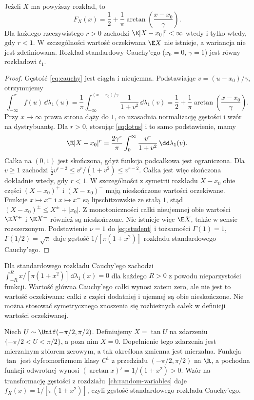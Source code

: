 \begin{stwierdzenie}
Jeżeli $X$ ma powyższy rozkład, to
\[
F_X(x)=\frac12+\frac1\pi
\arctan\!\left(\frac{x-x_0}{\gamma}\right).
\]
Dla każdego rzeczywistego $r>0$ zachodzi
$\E|X-x_0|^r<\infty$ wtedy i tylko wtedy, gdy $r<1$.
W szczególności wartość oczekiwana $\E X$ nie istnieje,
a wariancja nie jest zdefiniowana.
Rozkład standardowy Cauchy'ego ($x_0=0$, $\gamma=1$)
jest równy rozkładowi $t_1$.
\end{stwierdzenie}
\begin{proof}
Gęstość \eqref{eq:cauchy} jest ciągła i nieujemna.
Podstawiając $v=(u-x_0)/\gamma$, otrzymujemy
\[
\int_{-\infty}^x f(u)\,\dd\lambda_1(u)
=\frac1\pi\int_{-\infty}^{(x-x_0)/\gamma}
\frac{1}{1+v^2}\,\dd\lambda_1(v)
=\frac12+\frac1\pi\arctan\!\left(\frac{x-x_0}{\gamma}\right).
\]
Przy $x\to\infty$ prawa strona dąży do $1$, co
uzasadnia normalizację gęstości i wzór na dystrybuantę.
Dla $r>0$, stosując \eqref{eq:lotus} i to samo
podstawienie, mamy
\[
\E|X-x_0|^r=\frac{2\gamma^r}{\pi}
\int_0^\infty\frac{v^r}{1+v^2}\,\dd\lambda_1(v).
\]
Całka na $(0,1)$ jest skończona, gdyż funkcja
podcałkowa jest ograniczona. Dla $v\geq1$ zachodzi
$\tfrac12 v^{r-2}\leq v^r/(1+v^2)\leq v^{r-2}$.
Całka jest więc skończona dokładnie wtedy, gdy $r<1$.
W szczególności z symetrii rozkładu $X-x_0$ obie części
$(X-x_0)^+$ i $(X-x_0)^-$ mają nieskończone wartości
oczekiwane. Funkcje $x\mapsto x^+$ i $x\mapsto x^-$
są lipschitzowskie ze stałą $1$, stąd
$(X-x_0)^\pm\leq X^\pm+|x_0|$.
Z monotoniczności całki nieujemnej obie wartości
$\E X^+$ i $\E X^-$ również są nieskończone.
Nie istnieje więc $\E X$, także w sensie rozszerzonym.
Podstawienie $\nu=1$ do \eqref{eq:student} i tożsamości
$\Gamma(1)=1$, $\Gamma(1/2)=\sqrt\pi$ daje gęstość
$1/[\pi(1+x^2)]$ rozkładu standardowego Cauchy'ego.
\end{proof}

\begin{przyklad}
Dla standardowego rozkładu Cauchy'ego zachodzi
$\int_{-R}^{R}x/[\pi(1+x^2)]\,\dd\lambda_1(x)=0$
dla każdego $R>0$ z powodu nieparzystości funkcji.
Wartość główna Cauchy'ego całki wynosi zatem zero,
ale nie jest to wartość oczekiwana: całki z części dodatniej
i ujemnej są obie nieskończone. Nie można stosować
symetrycznego znoszenia się rozbieżnych całek w definicji
wartości oczekiwanej.
\end{przyklad}

\begin{przyklad}
Niech $U\sim\Unif(-\pi/2,\pi/2)$. Definiujemy
$X=\tan U$ na zdarzeniu $\{-\pi/2<U<\pi/2\}$,
a poza nim $X=0$. Dopełnienie tego zdarzenia jest
mierzalnym zbiorem zerowym, a tak określona zmienna
jest mierzalna. Funkcja $\tan$ jest dyfeomorfizmem
klasy $C^1$ z przedziału $(-\pi/2,\pi/2)$ na $\R$,
a pochodna funkcji odwrotnej wynosi
$(\arctan x)'=1/(1+x^2)>0$.
Wzór na transformację gęstości z rozdziału~\ref{ch:random-variables}
daje $f_X(x)=1/[\pi(1+x^2)]$, czyli gęstość standardowego
rozkładu Cauchy'ego.
\end{przyklad}


